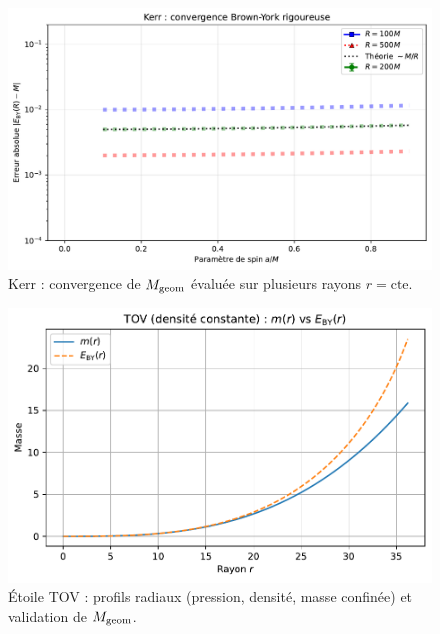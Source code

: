 \documentclass[11pt,a4paper]{article}
\theoremstyle{remark}
\begin{document}
\begin{figure}[htbp]
  \centering
  \includegraphics[width=\linewidth]{fig_kerr_multiradius.pdf}
  \caption{Kerr : convergence de $M_{\rm geom}$ évaluée sur plusieurs rayons $r=\mathrm{cte}$.}
  \label{fig:fig_kerr_multiradius}
\end{figure}

\begin{figure}[htbp]
  \centering
  \includegraphics[width=\linewidth]{fig_tov_full.pdf}
  \caption{Étoile TOV : profils radiaux (pression, densité, masse confinée) et validation de $M_{\rm geom}$.}
  \label{fig:fig_tov_full}
\end{figure}
\end{document}
